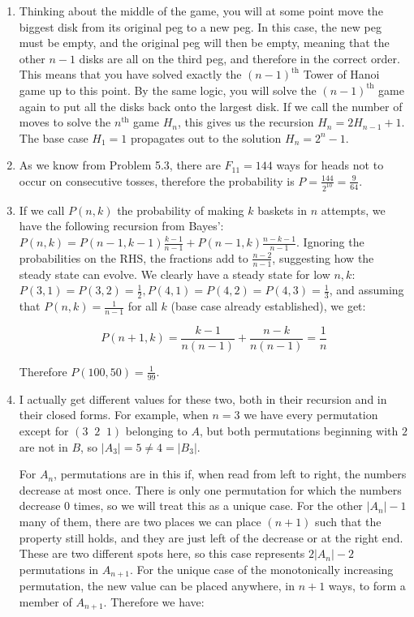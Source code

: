 \documentclass{book}
\numberwithin{equation}{section}
\begin{document}
\begin{enumerate}[label={5.\arabic*}]
\item
Thinking about the middle of the game, you will at some point move the biggest disk from its original
peg to a new peg. In this case, the new peg must be empty, and the original peg will then be empty,
meaning that the other $n-1$ disks are all on the third peg, and therefore in the correct order. This
means that you have solved exactly the $(n-1)^{\text{th}}$ Tower of Hanoi game up to this point. By
the same logic, you will solve the $(n-1)^{\text{th}}$ game again to put all the disks back onto the
largest disk. If we call the number of moves to solve the $n^{\text{th}}$ game $H_n$, this gives us the
recursion $H_n = 2H_{n-1}+1$. The base case $H_1 = 1$ propagates out to the solution $H_n = 2^n - 1$.

\item
As we know from Problem 5.3, there are $F_{11} = 144$ ways for heads not to occur on consecutive
tosses, therefore the probability is $P = \frac{144}{2^{10}} = \frac{9}{64}$.

\item
If we call $P(n, k)$ the probability of making $k$ baskets in $n$ attempts, we have the following recursion
from Bayes': $P(n, k) = P(n-1, k-1)\frac{k-1}{n-1} + P(n-1, k)\frac{n-k-1}{n-1}$. Ignoring the probabilities on
the RHS, the fractions add to $\frac{n-2}{n-1}$, suggesting how the steady state can evolve. We clearly have
a steady state for low $n, k$: $P(3, 1) = P(3, 2) = \frac{1}{2}, P(4, 1) = P(4, 2) = P(4, 3) = \frac{1}{3}$, and
assuming that $P(n, k) = \frac{1}{n-1}$ for all $k$ (base case already established), we get:

$$P(n+1, k) = \frac{k-1}{n(n-1)} + \frac{n-k}{n(n-1)} = \frac{1}{n}$$

Therefore $P(100, 50) = \frac{1}{99}$.

\item
I actually get different values for these two, both in their recursion and in their closed forms. For example,
when $n=3$ we have every permutation except for $(3 \;\; 2 \;\; 1)$ belonging to $A$, but both permutations
beginning with $2$ are not in $B$, so $|A_3| = 5 \neq 4 = |B_3|$.

For $A_n$, permutations are in this if, when read from left to right, the numbers decrease at most once. There
is only one permutation for which the numbers decrease 0 times, so we will treat this as a unique case. For the
other $|A_n| - 1$ many of them, there are two places we can place $(n+1)$ such that the property still holds, and
they are just left of the decrease or at the right end. These are two different spots here, so this case represents
$2|A_n| - 2$ permutations in $A_{n+1}$. For the unique case of the monotonically increasing permutation, the
new value can be placed anywhere, in $n+1$ ways, to form a member of $A_{n+1}$. Therefore we have:


\end{enumerate}
\end{document}
